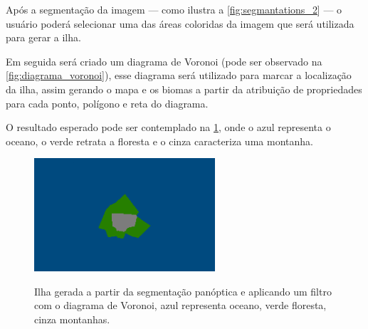 Após a segmentação da imagem — como ilustra a \cref{fig:segmantations_2} — o usuário poderá selecionar uma das áreas coloridas da imagem que será utilizada para gerar a ilha.

Em seguida será criado um diagrama de Voronoi (pode ser observado na \cref{fig:diagrama_voronoi}), esse diagrama será utilizado para marcar a localização da ilha, assim gerando o mapa e os biomas a partir da atribuição de propriedades para cada ponto, polígono e reta do diagrama.

O resultado esperado pode ser contemplado na \cref{fig:resultado_geracao}, onde o azul representa o oceano, o verde retrata a floresta e o cinza caracteriza uma montanha.

\begin{figure}[!ht]
	\centering
    \caption{Ilha gerada a partir da segmentação panóptica e aplicando um filtro com o diagrama de Voronoi, azul representa oceano, verde floresta, cinza montanhas.}
	\includegraphics[width=0.6\textwidth]{figures/segmantations_pnl.png}
	\label{fig:resultado_geracao}
\end{figure}

